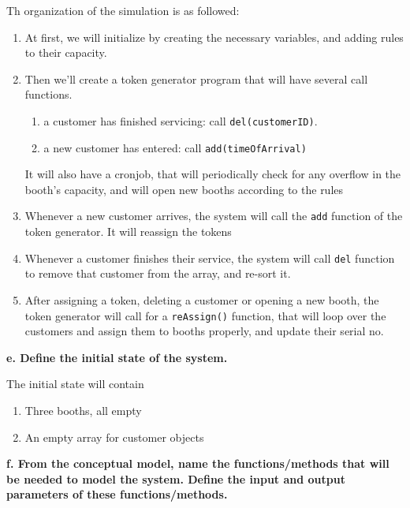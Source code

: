 \documentclass[article, 12pt, a4paper]{memoir}
\begin{document}
\begin{solution}
    [d] 
    Th organization of the simulation is as followed:
    \begin{enumerate}[left=0pt]
        \item At first, we will initialize by creating the necessary variables, and adding
            rules to their capacity.
        \item Then we'll create a token generator program that will have several call
            functions.
            \begin{enumerate}
                \item a customer has finished servicing: call \texttt{del(customerID)}.
                \item a new customer has entered: call \texttt{add(timeOfArrival)}
            \end{enumerate}
            It will also have a cronjob, that will periodically check for any overflow in
            the booth's capacity, and will open new booths according to the rules
        \item Whenever a new customer arrives, the system will call the \texttt{add}
            function of the token generator. It will reassign the tokens
        \item Whenever a customer finishes their service, the system will call
            \texttt{del} function to remove that customer from the array, and re-sort it.
        \item After assigning a token, deleting a customer or opening a new booth, the
            token generator will call for a \texttt{reAssign()} function, that will loop
            over the customers and assign them to booths properly, and update their serial
            no.
    \end{enumerate}
\end{solution}

\textbf{e. Define the initial state of the system.}
\vspace{1em}

\begin{solution}
    [e]
    The initial state will contain
    \begin{enumerate}
        \item Three booths, all empty
        \item An empty array for customer objects
    \end{enumerate}
\end{solution}

\newpage
\textbf{f. From the conceptual model, name the functions/methods that will be needed to
model the system. Define the input and output parameters of these functions/methods.}
\vspace{1em}
\end{document}
